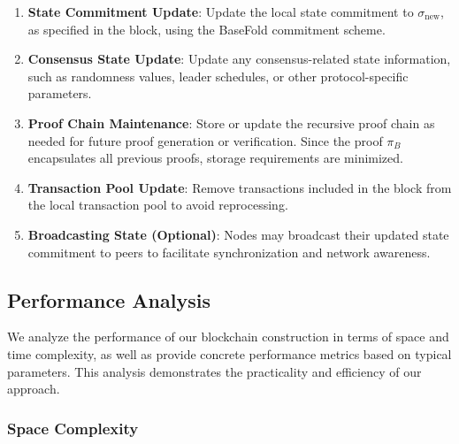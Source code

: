 \documentclass{article}
\theoremstyle{plain}
\theoremstyle{definition}
\theoremstyle{remark}
\theoremstyle{problem}
\begin{document}
\begin{enumerate}
    \item \textbf{State Commitment Update}: Update the local state commitment to $\sigma_{\text{new}}$, as specified in the block, using the BaseFold commitment scheme.

    \item \textbf{Consensus State Update}: Update any consensus-related state information, such as randomness values, leader schedules, or other protocol-specific parameters.

    \item \textbf{Proof Chain Maintenance}: Store or update the recursive proof chain as needed for future proof generation or verification. Since the proof $\pi_B$ encapsulates all previous proofs, storage requirements are minimized.

    \item \textbf{Transaction Pool Update}: Remove transactions included in the block from the local transaction pool to avoid reprocessing.

    \item \textbf{Broadcasting State (Optional)}: Nodes may broadcast their updated state commitment to peers to facilitate synchronization and network awareness.
\end{enumerate}

\subsection{Performance Analysis}

We analyze the performance of our blockchain construction in terms of space and time complexity, as well as provide concrete performance metrics based on typical parameters. This analysis demonstrates the practicality and efficiency of our approach.

\subsubsection{Space Complexity}
\end{document}
